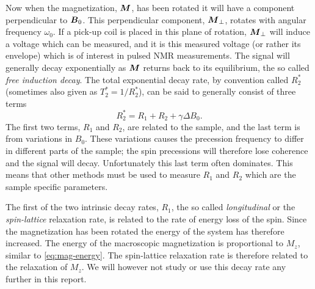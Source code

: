 \documentclass[11pt,a4paper, twocolumn,
swedish, english %
]{article}
\begin{document}

Now when the magnetization, $\vb*M$, has been rotated it will have a
component perpendicular to $\vb*B_0$. This perpendicular component,
$\vb*M_\perp$, rotates with angular frequency $\omega_0$. If a pick-up
coil is placed in this plane of rotation, $\vb*M_\perp$ will induce a
voltage which can be measured, and it is this measured voltage (or
rather its envelope) which is of interest in pulsed NMR
measurements. The signal will generally decay exponentially as
$\vb*M$ returns back to its equilibrium, the so called 
\emph{free induction decay}. The total exponential decay rate, by
convention called $R_2^*$ (sometimes also given as $T_2^*=1/R_2^*$),
can be said to generally consist of three terms 
\begin{equation}
R_2^*= R_1 + R_2 + \gamma\Delta B_0.
\end{equation}
The first two terms, $R_1$ and $R_2$, are related to the sample, and
the last term is from variations in $B_0$. These variations causes the
precession frequency to differ in different parts of the sample; the
spin precessions will therefore lose coherence and the signal will
decay. Unfortunately this last term often dominates. This means that
other methods must be used to measure $R_1$ and $R_2$ which are the
sample specific parameters. 

The first of the two intrinsic decay rates, $R_1$, the so called
\emph{longitudinal} or the \emph{spin-lattice} relaxation rate, is
related to the rate of energy loss of the spin. Since the
magnetization has been rotated the energy of the system has therefore
increased. The energy of the macroscopic magnetization is proportional
to $M_z$, similar to \eqref{eq:mag-energy}. The spin-lattice
relaxation rate is therefore related to the relaxation of $M_z$. We
will however not study or use this decay rate any further in this
report. 
\end{document}
